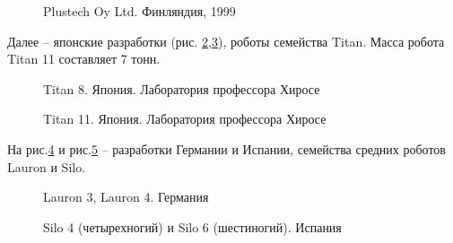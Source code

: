 \begin{figure}[here]
\caption{Plustech Oy Ltd. Финляндия, 1999}
\label{fig17}
\end{figure}

Далее – японские разработки (рис. \ref{fig18},\ref{fig19}), роботы семейства Titan. Масса робота Titan 11 составляет 7 тонн.

\begin{figure}[here]
\begin{minipage}{0.49\linewidth}
\end{minipage}
\hfill
\begin{minipage}{0.49\linewidth}
\end{minipage}
\caption{Titan 8. Япония. Лаборатория профессора Хиросе}
\label{fig18}
\end{figure}

\begin{figure}[here]
\caption{Titan 11. Япония. Лаборатория профессора Хиросе}
\label{fig19}
\end{figure}

На рис.\ref{fig20} и рис.\ref{fig21} – разработки Германии и Испании, семейства средних роботов Lauron и Silo.

\begin{figure}[here]
\begin{minipage}{0.49\linewidth}
\end{minipage}
\hfill
\begin{minipage}{0.49\linewidth}
\end{minipage}
\caption{Lauron 3, Lauron 4. Германия}
\label{fig20}
\end{figure} 

\begin{figure}[here]
\begin{minipage}{0.49\linewidth}
\end{minipage}
\hfill
\begin{minipage}{0.49\linewidth}
\end{minipage}
\caption{Silo 4 (четырехногий) и Silo 6 (шестиногий). Испания}
\label{fig21}
\end{figure}
 
\clearpage

